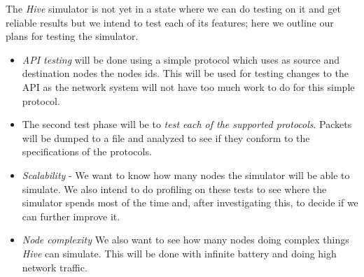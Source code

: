 
The \textit{Hive} simulator is not yet in a state where we can do testing on
it and get reliable results but  we intend to test each of its features; here
we outline our plans for testing the simulator.

\begin{itemize}
	\item \textit{API testing} will be done using a simple protocol
	which uses as source and destination nodes the nodes ids. This will be used
	for testing changes to the API as the network system will not
	have too much work to do for this simple protocol.
	\item The second test phase will be to \textit{test each of the
        supported protocols}. Packets
	will be dumped to a file and analyzed to see if they conform
	to the specifications of the protocols.
	\item \textit{Scalability} - We want to know how many nodes
	the simulator will be able to simulate. We also
	intend to do profiling on these tests to see where the simulator
	spends most of the time and, after investigating this, to decide if we can further improve it.
	\item \textit{Node complexity} We also want to see how
	many nodes doing complex things \textit{Hive} can simulate. This
	will be done with infinite battery and doing high network
	traffic.
\end{itemize}
